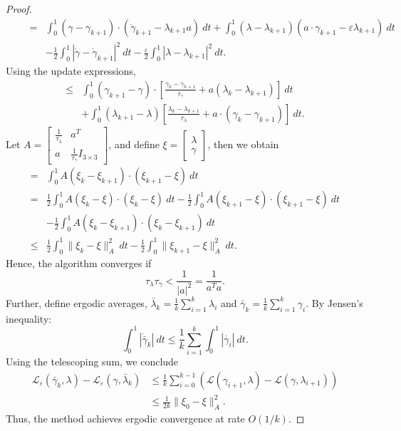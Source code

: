 \documentclass[12pt]{amsart}
\theoremstyle{definition}
\theoremstyle{remark}
\numberwithin{equation}{section}
\numberwithin{equation}{section}
\begin{document}
\begin{proof}
\begin{align*}
    \qquad  = &\int_0^1 (\gamma - \gamma_{k+1})\cdot (\ddot{\gamma}_{k+1} - \lambda_{k+1}a)~dt +\int_0^1 (\lambda-\lambda_{k+1})(a\cdot \gamma_{k+1} - \varepsilon\lambda_{k+1})~dt \\
      \qquad  &- \frac{1}{2}\int_0^1 |\dot{\gamma} - \dot{\gamma}_{k+1}|^2~dt - \frac{\varepsilon}{2}\int_0^1 |\lambda - \lambda_{k+1}|^2~dt.
\end{align*}
Using the update expressions, 
\begin{align*}
     \leq & \int_0^1 (\gamma_{k+1}-\gamma)\cdot \left[\frac{\gamma_k -\gamma_{k+1}}{\tau_{\gamma}} + a(\lambda_k -\lambda_{k+1})\right]~dt \\
    &+ \int_0^1(\lambda_{k+1}- \lambda)\left[\frac{\lambda_k - \lambda_{k+1}}{\tau_{\lambda}}+ a\cdot(\gamma_k - \gamma_{k+1})\right]~dt.
  \end{align*}   
  Let $A = \begin{bmatrix}
    \frac{1}{\tau_{\lambda}} & a^T\\
    a & \frac{1}{\tau_{\gamma}}I_{3\times 3}
\end{bmatrix}$, and define $\xi = \begin{bmatrix}
    \lambda\\ \gamma
\end{bmatrix}$, then we obtain 
  \begin{align*} 
     =& \int_0^1 A(\xi_k - \xi_{k+1})\cdot (\xi_{k+1}-\xi)~dt \\
     = & \frac{1}{2}\int_0^1 A(\xi_k - \xi)\cdot (\xi_k - \xi)~dt - \frac{1}{2}\int_0^1A(\xi_{k+1} - \xi)\cdot (\xi_{k+1}- \xi)~dt\\ &- \frac{1}{2}\int_0^1 A(\xi_k - \xi_{k+1})\cdot (\xi_k- \xi_{k+1})~dt\\
     \leq &\frac{1}{2}\int_0^1 \|\xi_k - \xi\|_A^2~dt - \frac{1}{2}\int_0^1 \|\xi_{k+1}- \xi\|_A^2~dt.
\end{align*}
Hence, the algorithm converges if
\[\tau_{\lambda}\tau_{\gamma} < \frac{1}{|a|^2} = \frac{1}{a^Ta}.\] 
Further, define ergodic averages,    $\bar{\lambda}_k = \frac{1}{k}\sum_{i=1}^k \lambda_i$ and 
$\bar{\gamma}_k = \frac{1}{k}\sum_{i=1}^k \gamma_i$. 
By Jensen's inequality: 
\[\int_0^1 |\dot{\bar{\gamma}}_k|~dt  \leq \frac{1}{k}\sum_{i=1}^k\int_0^1 |\dot{\gamma_i}|~dt.\]
Using the telescoping sum, we conclude  
\begin{align*}
    \mathcal{L}_{\varepsilon}(\bar{\gamma}_k, \lambda) - \mathcal{L}_{\varepsilon}(\gamma, \bar{\lambda}_k) 
    & \leq \frac{1}{k}\sum_{i=0}^{k-1} (\mathcal{L}(\gamma_{i+1}, \lambda) -  \mathcal{L}(\gamma,\lambda_{i+1}))\\
     & \leq \frac{1}{2k}\|\xi_0 -  \xi\|^2_A. 
\end{align*}
Thus, the method achieves ergodic convergence at rate $O(1/k)$.
\end{proof}
\end{document}

